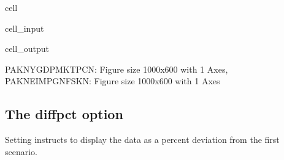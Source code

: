 \documentclass[letterpaper,10pt,english]{jupyterBook}
\begin{document}
\begin{sphinxuseclass}{cell}\begin{sphinxVerbatimInput}

\begin{sphinxuseclass}{cell_input}
\begin{sphinxVerbatim}[commandchars=\\\{\}]
  
\end{sphinxVerbatim}

\end{sphinxuseclass}\end{sphinxVerbatimInput}
\begin{sphinxVerbatimOutput}

\begin{sphinxuseclass}{cell_output}
\begin{sphinxVerbatim}[commandchars=\\\{\}]
\PYGZob{}\PYGZsq{}PAKNYGDPMKTPCN\PYGZsq{}: \PYGZlt{}Figure size 1000x600 with 1 Axes\PYGZgt{},
 \PYGZsq{}PAKNEIMPGNFSKN\PYGZsq{}: \PYGZlt{}Figure size 1000x600 with 1 Axes\PYGZgt{}\PYGZcb{}
\end{sphinxVerbatim}

\end{sphinxuseclass}\end{sphinxVerbatimOutput}

\end{sphinxuseclass}

\subsection{The diffpct option}
\label{\detokenize{content/06_WBModels/ScenarioAnalysis:the-diffpct-option}}
\sphinxAtStartPar
Setting  instructs  to display the data as a percent deviation from the first  scenario.
\end{document}
